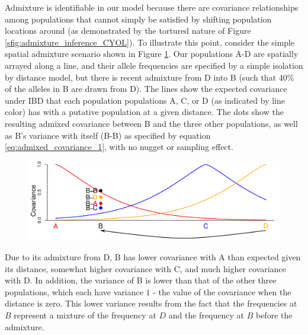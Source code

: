 \documentclass[12pt]{article}
\newcommand{\gb}[1]{{\em \color{magenta} #1}}
\begin{document}
Admixture is identifiable in our model because there are covariance relationships among populations that cannot simply be satisfied by shifting population locations around (as demonstrated by the tortured nature of Figure \ref{sfig:admixture_inference_CYOL}). To illustrate this point, consider the simple spatial admixture scenario shown in Figure \ref{fig:toy_admixture}. Our populations A-D are spatially arrayed  along a line, and their allele frequencies are specified by a simple isolation by distance model, but there is recent admixture from D into B (such that 40\% of the alleles in B are drawn from D). The lines show the expected covariance under IBD that each population populations A, C, or D (as indicated by line color) has with a putative population at a given distance.  The dots show the resulting admixed covariance between B and the three other populations, as well as B's variance with itself (B-B) as specified by equation \eqref{eq:admixed_covariance_1}, with no nugget or sampling effect.

\begin{figure}[ht!]
	\centering
	\includegraphics[width=\textwidth]{figs/sims/Admix_covar_toy_fig.pdf}
	\caption{} \label{fig:toy_admixture}
\end{figure}

Due to its admixture from D, B has lower covariance with A than expected given its distance, somewhat higher covariance with C, and much higher covariance with D. In addition, the variance of B is lower than that of the other three populations, which each have variance $1$ - the value of the covariance when the distance is zero. This lower variance results from the fact that the frequencies at $B$ represent a mixture of the frequency at $D$ and the frequency at $B$ before the admixture. 
\end{document}
